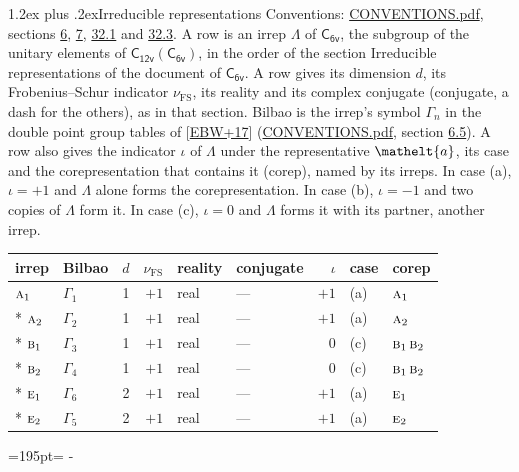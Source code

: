 \documentclass[10pt,a4paper]{article}
\makeatletter
\renewcommand\section{\@startsection{section}{1}{\z@}{-3ex plus -1ex minus -.2ex}%
  {1.2ex plus .2ex}{\normalfont\large\sffamily\bfseries\color{parttitle}}}
\newcommand{\needspace}[1]{\par\penalty-100\begingroup\dimen0=#1\relax\dimen2=\pagegoal
  \advance\dimen2-\pagetotal\ifdim\dimen0>\dimen2\relax\ifdim\dimen2>0pt\vfil\break\fi\fi
  \endgroup}
\numberwithin{equation}{section}
\newcommand{\eltfont}[1]{{\let\sigma\eltsigma\mathelt{#1}}}
\newcommand{\grp}[1]{\mathsf{#1}}
\newcommand{\irr}[1]{\text{\normalfont\scshape #1}}
\newcommand{\elt}[1]{\eltfont{#1}}
\newcommand{\fsind}{\nu_{\mathrm{FS}}}
\makeatother
\begin{document}
\section{Irreducible representations}\label{s:irreps}
Conventions: \href{../../CONVENTIONS.pdf}{CONVENTIONS.pdf}, sections \href{../../../rotation/CONVENTIONS.pdf\#conv.6}{6}, \href{../../../rotation/CONVENTIONS.pdf\#conv.7}{7}, \href{../../CONVENTIONS.pdf\#conv.32.1}{32.1} and \href{../../CONVENTIONS.pdf\#conv.32.3}{32.3}.
\leavevmode\label{n:irrep.Delta}A row is an irrep $\Lambda$ of $\grp{C_{6v}}$, the subgroup of the unitary elements of $\grp{C_{12v}}(\grp{C_{6v}})$, in the order of the section Irreducible representations of the document of \href{../../../rotation/data/pdf/C6v.pdf}{$\grp{C_{6v}}$}. \label{n:index.dimension}\label{n:index.frobenius}\label{n:head.irrep}\label{n:head.reality}\label{n:head.conjugate}A row gives its dimension $d$, its Frobenius--Schur indicator $\fsind$, its reality and its complex conjugate (conjugate, a dash for the others), as in that section. \label{n:head.bilbao}\label{n:irrep.alias.gamma}Bilbao is the irrep's symbol $\Gamma_n$ in the double point group tables of [\href{../../../REFERENCES.pdf\#ref.EBW+17}{EBW+17}] (\href{../../CONVENTIONS.pdf}{CONVENTIONS.pdf}, section \href{../../../rotation/CONVENTIONS.pdf\#conv.6.5}{6.5}). \label{n:head.case.corep}\label{n:head.corep}A row also gives the indicator $\iota$ of $\Lambda$ under the representative $\elt{a}$, its case and the corepresentation that contains it (corep), named by its irreps. In case (a), $\iota = +1$ and $\Lambda$ alone forms the corepresentation. In case (b), $\iota = -1$ and two copies of $\Lambda$ form it. In case (c), $\iota = 0$ and $\Lambda$ forms it with its partner, another irrep.
\setlength{\emergencystretch}{2em}\par\setlength{\emergencystretch}{0pt}
{\small\renewcommand{\arraystretch}{1.25}\setlength{\tabcolsep}{4pt}\begin{longtable}{@{}llrrllrll@{}}\toprule
irrep & Bilbao & $d$ & $\fsind$ & reality & conjugate & $\iota$ & case & corep\\\midrule\endhead
\bottomrule\endfoot\endlastfoot
$\irr{a}_{1}$ & $\Gamma_{1}$ & 1 & $+1$ & real & --- & $+1$ & (a) & $\irr{a}_{1}$\\*
$\irr{a}_{2}$ & $\Gamma_{2}$ & 1 & $+1$ & real & --- & $+1$ & (a) & $\irr{a}_{2}$\\*
$\irr{b}_{1}$ & $\Gamma_{3}$ & 1 & $+1$ & real & --- & $0$ & (c) & $\irr{b}_{1}\,\irr{b}_{2}$\\*
$\irr{b}_{2}$ & $\Gamma_{4}$ & 1 & $+1$ & real & --- & $0$ & (c) & $\irr{b}_{1}\,\irr{b}_{2}$\\*
$\irr{e}_{1}$ & $\Gamma_{6}$ & 2 & $+1$ & real & --- & $+1$ & (a) & $\irr{e}_{1}$\\*
$\irr{e}_{2}$ & $\Gamma_{5}$ & 2 & $+1$ & real & --- & $+1$ & (a) & $\irr{e}_{2}$\\
\bottomrule\end{longtable}}
\needspace{195pt}
\end{document}
